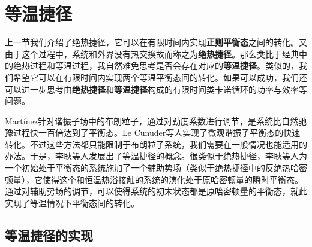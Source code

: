 \section{等温捷径}
    
\qquad 上一节我们介绍了绝热捷径，它可以在有限时间内实现\textbf{正则平衡态}之间的转化。又由于这个过程中，系统和外界没有热交换故而称之为\textbf{绝热捷径}。那么类比于经典中的绝热过程和等温过程，我自然难免思考是否会存在对应的\textbf{等温捷径}。类似的，我们希望它可以在有限时间内实现两个等温平衡态间的转化。如果可以成功，我们还可以进一步思考由\textbf{绝热捷径}和\textbf{等温捷径}构成的有限时间类卡诺循环的功率与效率等问题。

Martínez\cite{Martinez2016}针对谐振子场中的布朗粒子，通过对劲度系数进行调节，是系统比自然驰豫过程快一百倍达到了平衡态。Le Cunuder等人\cite{LeCunuder2016}实现了微观谐振子平衡态的快速转化。不过这些方法都只能限制于布朗粒子系统，我们需要在一般情况也能适用的办法。于是，李耿等人\cite{Li2016}发展出了等温捷径的概念。很类似于绝热捷径，李耿等人为一个初始处于平衡态的系统施加了一个辅助势场（类似于绝热捷径中的反绝热哈密顿量），它使得这个和恒温热浴接触的系统的演化处于原哈密顿量的瞬时平衡态。通过对辅助势场的调节，可以使得系统的初末状态都是原哈密顿量的平衡态，就此实现了等温情况下平衡态间的转化。

\subsection{等温捷径的实现}


